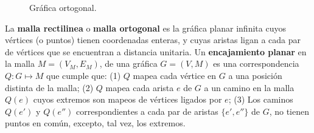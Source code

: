 \begin{figure}
  \caption{Gr\'afica ortogonal.}
\end{figure}

\begin{definition}
La \textbf{malla rectilinea} o \textbf{malla ortogonal} es la gr\'afica planar infinita cuyos v\'ertices (o puntos) tienen coordenadas enteras, y cuyas aristas ligan a cada par de v\'ertices que se encuentran a distancia unitaria. Un \textbf{encajamiento planar} en la malla $M = (V_M, E_M)$, de una gr\'afica $G = (V, M)$ es una correspondencia $Q: G\mapsto M$ que cumple que: (1) $Q$ mapea cada v\'ertice en $G$ a una posici\'on distinta de la malla; (2) $Q$ mapea cada arista $e$ de $G$ a un camino en la malla $Q(e)$ cuyos extremos son mapeos de v\'ertices ligados por $e$; (3) Los caminos $Q(e')$ y $Q(e'')$ correspondientes a cada par de aristas $\{e', e''\}$ de $G$, no tienen puntos en com\'un, excepto, tal vez, los extremos.
\end{definition}

